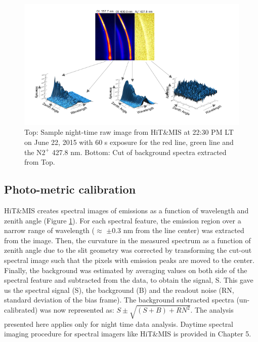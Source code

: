 \documentclass[crop=false,class=mitthesis,oneside,font=12pt]{standalone}
\begin{document}
\begin{figure}[H]
	\centering\includegraphics[width=35pc]{cut_hm.png}
	\caption{Top: Sample night-time raw image from HiT\&MIS at 22:30 PM LT on June 22, 2015 with 60 s exposure for the red line, green line and the N$2^+$ 427.8 nm. Bottom: Cut of background spectra extracted from Top.}
	\label{fig:cut_hm}
\end{figure}

\subsection{Photo-metric calibration}
HiT\&MIS creates spectral images of emissions as a function of wavelength and zenith angle (Figure \ref{fig:cut_hm}). For each spectral feature, the emission region over a narrow range of wavelength ($\approx$ $\pm$0.3 nm from the line center) was extracted from the image. Then, the curvature in the measured spectrum as a function of zenith angle due to the slit geometry was corrected by transforming the cut-out spectral image such that the pixels with emission peaks are moved to the center. Finally, the background was estimated by averaging values on both side of the spectral feature and subtracted from the data, to obtain the signal, S. This gave us the spectral signal (S), the background (B) and the readout noise (RN, standard deviation of the bias frame). The background subtracted spectra (un-calibrated) was now represented as: $S \pm \sqrt{(S+B) + RN^2}$.  The analysis presented here applies only for night time data analysis. Daytime spectral imaging procedure for spectral imagers like HiT\&MIS is provided in Chapter 5.
\end{document}
